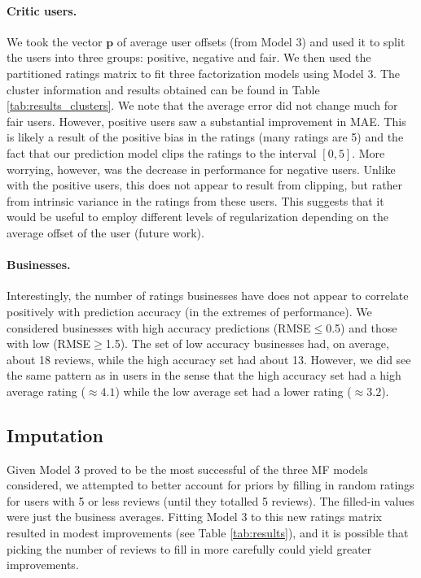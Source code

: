 \documentclass[12pt]{article}
\newcommand{\mbf}[1]{\mathbf{#1}}
\begin{document}
\begin{multicols}{2}
\paragraph{Critic users.} We took the vector $\mbf p$ of average user offsets (from Model 3) and used it to split the users into three groups: positive, negative and fair. We then used the partitioned ratings matrix to fit three factorization models using Model 3. The cluster information and results obtained can be found in Table \ref{tab:results_clusters}. We note that the average error did not change much for fair users. However, positive users saw a substantial improvement in MAE. This is likely a result of the positive bias in the ratings (many ratings are 5) and the fact that our prediction model clips the ratings to the interval $[0,5]$. More worrying, however, was the decrease in performance for negative users. Unlike with the positive users, this does not appear to result from clipping, but rather from intrinsic variance in the ratings from these users. This suggests that it would be useful to employ different levels of regularization depending on the average offset of the user (future work).

\paragraph{Businesses.} Interestingly, the number of ratings businesses have does not appear to correlate positively with prediction accuracy (in the extremes of performance). We considered businesses with high accuracy predictions (RMSE$\leq$0.5) and those with low (RMSE$\geq$1.5). The set of low accuracy businesses had, on average, about 18 reviews, while the high accuracy set had about 13. However, we did see the same pattern as in users in the sense that the high accuracy set had a high average rating ($\approx4.1$) while the low average set had a lower rating ($\approx3.2$).

\subsection{Imputation}  
Given Model 3 proved to be the most successful of the three MF models considered, we attempted to better account for priors by filling in random ratings for users with 5 or less reviews (until they totalled 5 reviews). The filled-in values were just the business averages. Fitting Model 3 to this new ratings matrix resulted in modest improvements (see Table \ref{tab:results}), and it is possible that picking the number of reviews to fill in more carefully could yield greater improvements. 


\end{multicols}
\end{document}
